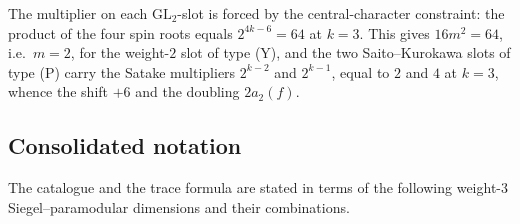 \documentclass[11pt]{amsart}
\theoremstyle{plain}
\theoremstyle{definition}
\begin{document}
	The multiplier on each $\mathrm{GL}_2$-slot is forced by the
	central-character constraint: the product of the four spin roots equals
	$2^{4k-6}=64$ at $k=3$. This gives $16m^2=64$, i.e.\ $m=2$, for the
	weight-$2$ slot of type (Y), and the two Saito--Kurokawa slots of type (P)
	carry the Satake multipliers $2^{k-2}$ and $2^{k-1}$, equal to $2$ and $4$
	at $k=3$, whence the shift $+6$ and the doubling $2a_2(f)$.
	
	\subsection{Consolidated notation}
	\label{ss:notation}
	
	The catalogue and the trace formula are stated in terms of the following
	weight-$3$ Siegel--paramodular dimensions and their combinations.
	
\end{document}

